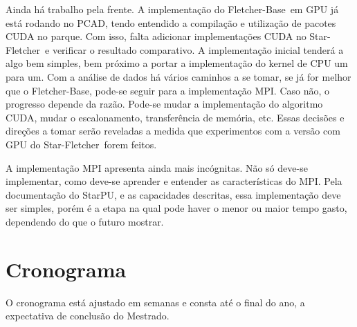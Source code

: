 \documentclass[ppgc,pep]{infufrgs}
\newcommand{\StarFletch}{Star-Fletcher}
\newcommand{\FletchBase}{Fletcher-Base}
\begin{document}
Ainda há trabalho pela frente. A implementação do \FletchBase\ em GPU já está rodando no PCAD, tendo entendido a compilação e utilização de pacotes CUDA no parque. Com isso, falta adicionar implementações CUDA no \StarFletch\ e verificar o resultado comparativo. A implementação inicial tenderá a algo bem simples, bem próximo a portar a implementação do kernel de CPU um para um. Com a análise de dados há vários caminhos a se tomar, se já for melhor que o \FletchBase, pode-se seguir para a implementação MPI. Caso não, o progresso depende da razão. Pode-se mudar a implementação do algoritmo CUDA, mudar o escalonamento, transferência de memória, etc. Essas decisões e direções a tomar serão reveladas a medida que experimentos com a versão com GPU do \StarFletch\ forem feitos.

A implementação MPI apresenta ainda mais incógnitas. Não só deve-se implementar, como deve-se aprender e entender as características do MPI. Pela documentação do StarPU, e as capacidades descritas, essa implementação deve ser simples, porém é a etapa na qual pode haver o menor ou maior tempo gasto, dependendo do que o futuro mostrar.

\chapter{Cronograma}
\label{cap:cronograma}

O cronograma está ajustado em semanas e consta até o final do ano, a expectativa de conclusão do Mestrado.
\end{document}
